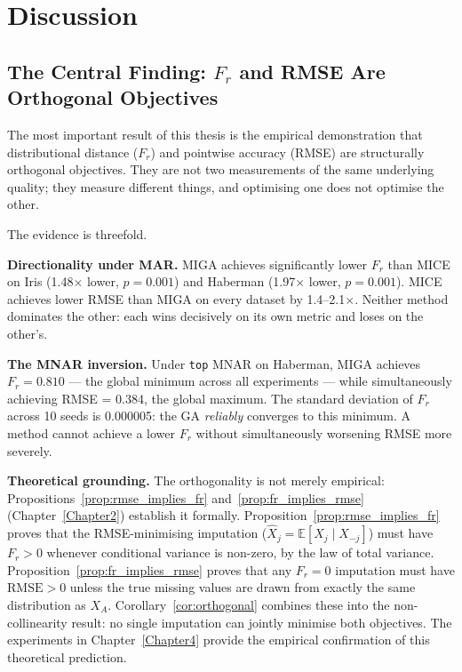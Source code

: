 
\chapter{Discussion}
\label{Chapter5}


\section{The Central Finding: $F_r$ and RMSE Are Orthogonal Objectives}

The most important result of this thesis is the empirical demonstration that distributional distance ($F_r$) and pointwise accuracy (RMSE) are structurally orthogonal objectives. They are not two measurements of the same underlying quality; they measure different things, and optimising one does not optimise the other.

The evidence is threefold.

\textbf{Directionality under MAR.} MIGA achieves significantly lower $F_r$ than MICE on Iris (1.48$\times$ lower, $p = 0.001$) and Haberman (1.97$\times$ lower, $p = 0.001$). MICE achieves lower RMSE than MIGA on every dataset by 1.4--2.1$\times$. Neither method dominates the other: each wins decisively on its own metric and loses on the other's.

\textbf{The MNAR inversion.} Under \texttt{top} MNAR on Haberman, MIGA achieves $F_r = 0.810$ --- the global minimum across all experiments --- while simultaneously achieving RMSE = 0.384, the global maximum. The standard deviation of $F_r$ across 10 seeds is 0.000005: the GA \emph{reliably} converges to this minimum. A method cannot achieve a lower $F_r$ without simultaneously worsening RMSE more severely.

\textbf{Theoretical grounding.} The orthogonality is not merely empirical: Propositions~\ref{prop:rmse_implies_fr} and~\ref{prop:fr_implies_rmse} (Chapter~\ref{Chapter2}) establish it formally. Proposition~\ref{prop:rmse_implies_fr} proves that the RMSE-minimising imputation ($\hat{X}_j = \mathbb{E}[X_j \mid X_{-j}]$) must have $F_r > 0$ whenever conditional variance is non-zero, by the law of total variance. Proposition~\ref{prop:fr_implies_rmse} proves that any $F_r = 0$ imputation must have $\mathrm{RMSE} > 0$ unless the true missing values are drawn from exactly the same distribution as $X_A$. Corollary~\ref{cor:orthogonal} combines these into the non-collinearity result: no single imputation can jointly minimise both objectives. The experiments in Chapter~\ref{Chapter4} provide the empirical confirmation of this theoretical prediction.

